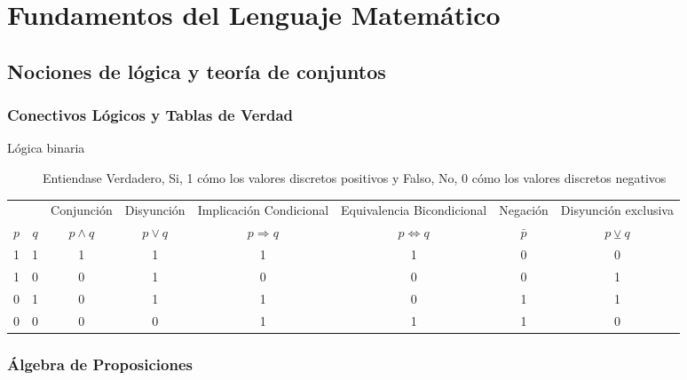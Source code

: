 \section{Fundamentos del Lenguaje Matemático}
\subsection{Nociones de lógica y teoría de conjuntos}
\subsubsection{Conectivos Lógicos y Tablas de Verdad}
\begin{description}
	\item[Lógica binaria] Entiendase Verdadero, Si, 1 cómo los valores discretos positivos y Falso, No, 0 cómo los valores discretos negativos
\end{description}
\begingroup
\setlength{\tabcolsep}{5pt} %
\renewcommand{\arraystretch}{1.5} %
\begin{center}
  \begin{tabular}{c|c|cccccc}
              &           & Conjunción         & Disyunción       & Implicación Condicional & Equivalencia Bicondicional  & Negación        & Disyunción exclusiva \\
    {\bf $p$} & {\bf $q$} & {\bf $p \wedge q$} & {\bf $p \vee q$} & {\bf $p \Rightarrow q$} & {\bf $p \Leftrightarrow q$} & {\bf $\bar{p}$} & {\bf $p \veebar q$}  \\\hline
    1         & 1         & 1                  & 1                & 1                       & 1                           & 0               & 0                    \\
    1         & 0         & 0                  & 1                & 0                       & 0                           & 0               & 1                    \\
    0         & 1         & 0                  & 1                & 1                       & 0                           & 1               & 1                    \\
    0         & 0         & 0                  & 0                & 1                       & 1                           & 1               & 0
  \end{tabular}
\end{center}
\endgroup

\subsubsection{Álgebra de Proposiciones}

